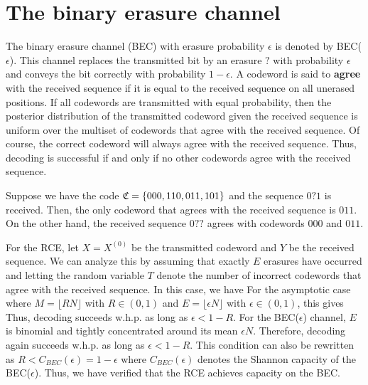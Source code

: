 \documentclass[letterpaper,english,10pt]{article}
\begin{document}
\section{The binary erasure channel}
The binary erasure channel (BEC) with erasure probability $\epsilon$ is denoted by BEC($\epsilon$).  
This channel replaces the transmitted bit by an erasure $?$ with probability $\epsilon$  and conveys the bit correctly with probability $1-\epsilon$. 
A codeword is said to \textbf{agree} with the received sequence if it is equal to the received sequence on all unerased positions. 
If all codewords are transmitted with equal probability, then the posterior distribution of the transmitted codeword given the received sequence is uniform over the multiset of codewords that agree with the received sequence. 
Of course, the correct codeword will always agree with the received sequence. 
Thus, decoding is successful if and only if no other codewords agree with the received sequence. 
\begin{shaded*}
\begin{exmp}
Suppose we have the code $\mathfrak{C} = \left\{000, 110, 011, 101\right\}$ and the sequence $0?1$ is received. 
Then, the only codeword that agrees with the received sequence is $011$. 
On the other hand, the received sequence $0??$ agrees with codewords $000$ and $011$. 
\end{exmp}
\end{shaded*}
For the RCE, let  $X = X^{(0)}$ be the transmitted codeword and $Y$ be the received sequence. 
We can analyze this by assuming that exactly $E$ erasures have occurred and letting the random variable  $T$ denote the number of incorrect codewords that agree with the received sequence. 
In this case, we have 
For the asymptotic case where $M = \lfloor RN\rfloor$ with $R \in (0,1)$ and $E = \lfloor \epsilon N\rfloor$ with $\epsilon \in (0,1)$, this gives
Thus, decoding succeeds w.h.p. as long as $\epsilon < 1 - R$. 
For the BEC($\epsilon$) channel, $E$ is binomial and tightly concentrated around its mean $\epsilon N$. 
Therefore, decoding again succeeds w.h.p. as long as $\epsilon < 1 - R$. 
This condition can also be rewritten as $R < C_{BEC}(\epsilon) = 1 - \epsilon$ where $C_{BEC}(\epsilon)$ denotes the Shannon capacity of the BEC($\epsilon$). 
Thus, we have verified that the RCE achieves capacity on the BEC. 
\end{document}
